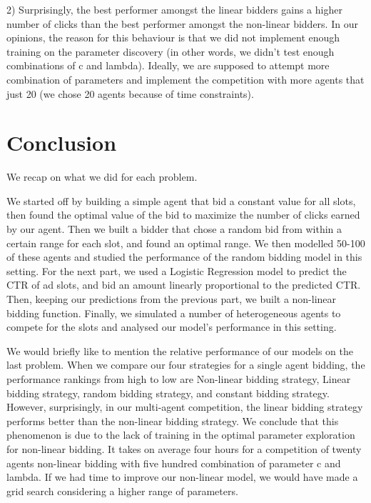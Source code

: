 \documentclass{sig-alternate-05-2015}
\begin{document}
2) Surprisingly, the best performer amongst the linear bidders gains a higher number of clicks than the best performer amongst the non-linear bidders.
In our opinions, the reason for this behaviour is that we did not implement enough training on the parameter discovery (in other words, we didn't test enough combinations of c and lambda).
Ideally, we are supposed to attempt more combination of parameters and implement the competition with more agents that just 20 (we chose 20 agents because of time constraints).

\section{Conclusion}

We recap on what we did for each problem.

We started off by building a simple agent that bid a constant value for all slots, then found the optimal value of the bid to maximize the number of clicks earned by our agent.
Then we built a bidder that chose a random bid from within a certain range for each slot, and found an optimal range.
We then modelled 50-100 of these agents and studied the performance of the random bidding model in this setting.
For the next part, we used a Logistic Regression model to predict the CTR of ad slots, and bid an amount linearly proportional to the predicted CTR.
Then, keeping our predictions from the previous part, we built a non-linear bidding function.
Finally, we simulated a number of heterogeneous agents to compete for the slots and analysed our model's performance in this setting.

%
We would briefly like to mention the relative performance of our models on the last problem.
When we compare our four strategies for a single agent bidding, the performance rankings from high to low are Non-linear bidding strategy, Linear bidding strategy, random bidding strategy, and constant bidding strategy.
However, surprisingly, in our multi-agent competition, the linear bidding strategy performs better than the non-linear bidding strategy.
We conclude that this phenomenon is due to the lack of training in the optimal parameter exploration for non-linear bidding. It takes on average four hours for a competition of twenty agents non-linear bidding with five hundred combination of parameter c and lambda. If we had time to improve our non-linear model, we would have made a grid search considering a higher range of parameters.
\end{document}
